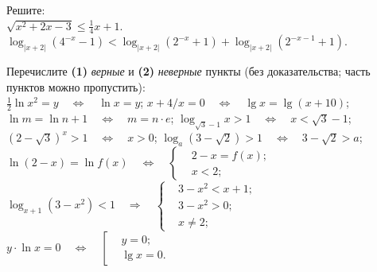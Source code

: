 %
%



\begin{problems}

\item
Решите:
\\
\sbp $\sqrt{x^2 + 2 x - 3} \leq \frac{1}{4} x + 1$.
\\[0.5ex]
\sbp
\(
    \log_{|x + 2|} (4^{-x} - 1)
    <
    \log_{|x + 2|} (2^{-x} + 1)
    +
    \log_{|x + 2|} (2^{-x - 1} + 1)
\).

\item
Перечислите \textbf{(1)} \emph{верные} и \textbf{(2)} \emph{неверные} пункты
(без доказательства; часть пунктов можно пропустить):
\\%
\sbp $\frac{1}{2} \ln x^2 = y \quad\Leftrightarrow\quad \ln x = y$;
\qquad%
\sbp $x + 4/x = 0 \quad\Leftrightarrow\quad \lg x = \lg (x + 10)$;
\\[0.5ex]%
\sbp $\ln m = \ln n + 1 \quad\Leftrightarrow\quad m = n \cdot e$;
\qquad%
\sbp $\log_{\sqrt{3} - 1} x > 1 \quad\Leftrightarrow\quad x < \sqrt{3} - 1$;
\\[0.5ex]%
\sbp $(2 - \sqrt{3})^x > 1 \quad\Leftrightarrow\quad x > 0$;
\qquad%
\sbp $\log_a (3 - \sqrt{2}) > 1 \quad\Leftrightarrow\quad 3 - \sqrt{2} > a$;
\\%
\sbp
\(
    \ln (2 - x) = \ln f(x)
\quad\Leftrightarrow\quad
    \left\{\begin{aligned}
        & 2 - x = f(x) ; \\
        & x < 2 ;
    \end{aligned}\right.
\)
\\[1ex]%
\sbp
\(
    \log_{x + 1} (3 - x^2) < 1
\quad\Rightarrow\quad
    \left\{\begin{aligned}
        & 3 - x^2 < x + 1 ; \\
        & 3 - x^2 > 0 ; \\
        & x \neq 2 ;
    \end{aligned}\right.
\)
\\[1ex]%
\sbp
\(
    y \cdot \ln x = 0
\quad\Leftrightarrow\quad
    \left[\begin{aligned}
        & y = 0 ; \\
        & \lg x = 0 .
    \end{aligned}\right.
\)

\end{problems}


